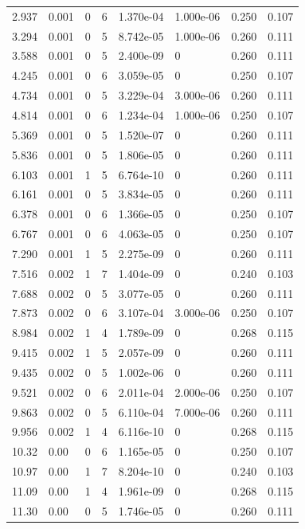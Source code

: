 \documentclass[preview]{standalone}
\begin{document}
{{\begin{tabular}{L{1.2cm}C{1.2cm} C{0.3cm}C{0.5cm} C{1.4cm}C{1.4cm} C{1.4cm}C{1.4cm}}
  2.937  &  0.001  & 0     &  6 &  1.370e-04  & 1.000e-06  & 0.250 &  0.107   \\ 
  3.294  &  0.001  & 0     &  5 &  8.742e-05  & 1.000e-06  & 0.260 &  0.111   \\ 
  3.588  &  0.001  & 0     &  5 &  2.400e-09  & 0  & 0.260 &  0.111   \\ 
  4.245  &  0.001  & 0     &  6 &  3.059e-05  & 0  & 0.250 &  0.107   \\ 
  4.734  &  0.001  & 0     &  5 &  3.229e-04  & 3.000e-06  & 0.260 &  0.111   \\ 
  4.814  &  0.001  & 0     &  6 &  1.234e-04  & 1.000e-06  & 0.250 &  0.107   \\ 
  5.369  &  0.001  & 0     &  5 &  1.520e-07  & 0  & 0.260 &  0.111   \\ 
  5.836  &  0.001  & 0     &  5 &  1.806e-05  & 0  & 0.260 &  0.111   \\ 
  6.103  &  0.001  & 1     &  5 &  6.764e-10  & 0  & 0.260 &  0.111   \\ 
  6.161  &  0.001  & 0     &  5 &  3.834e-05  & 0  & 0.260 &  0.111   \\ 
  6.378  &  0.001  & 0     &  6 &  1.366e-05  & 0  & 0.250 &  0.107   \\ 
  6.767  &  0.001  & 0     &  6 &  4.063e-05  & 0  & 0.250 &  0.107   \\ 
  7.290  &  0.001  & 1     &  5 &  2.275e-09  & 0  & 0.260 &  0.111   \\ 
  7.516  &  0.002  & 1     &  7 &  1.404e-09  & 0  & 0.240 &  0.103   \\ 
  7.688  &  0.002  & 0     &  5 &  3.077e-05  & 0  & 0.260 &  0.111   \\ 
  7.873  &  0.002  & 0     &  6 &  3.107e-04  & 3.000e-06  & 0.250 &  0.107   \\ 
  8.984  &  0.002  & 1     &  4 &  1.789e-09  & 0  & 0.268 &  0.115   \\ 
  9.415  &  0.002  & 1     &  5 &  2.057e-09  & 0  & 0.260 &  0.111   \\ 
  9.435  &  0.002  & 0     &  5 &  1.002e-06  & 0  & 0.260 &  0.111   \\ 
  9.521  &  0.002  & 0     &  6 &  2.011e-04  & 2.000e-06  & 0.250 &  0.107   \\ 
  9.863  &  0.002  & 0     &  5 &  6.110e-04  & 7.000e-06  & 0.260 &  0.111   \\ 
  9.956  &  0.002  & 1     &  4 &  6.116e-10  & 0  & 0.268 &  0.115   \\ 
  10.32  &  0.00  & 0     &  6 &  1.165e-05  & 0  & 0.250 &  0.107   \\ 
  10.97  &  0.00  & 1     &  7 &  8.204e-10  & 0  & 0.240 &  0.103   \\ 
  11.09  &  0.00  & 1     &  4 &  1.961e-09  & 0  & 0.268 &  0.115   \\ 
  11.30  &  0.00  & 0     &  5 &  1.746e-05  & 0  & 0.260 &  0.111   \\ 
\hline 
\end{tabular} 

}}
\end{document}
